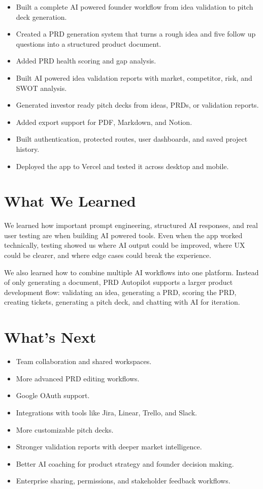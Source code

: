 \documentclass[11pt]{article}
\begin{document}
\begin{itemize}
    \item Built a complete AI powered founder workflow from idea validation to pitch deck generation.
    \item Created a PRD generation system that turns a rough idea and five follow up questions into a structured product document.
    \item Added PRD health scoring and gap analysis.
    \item Built AI powered idea validation reports with market, competitor, risk, and SWOT analysis.
    \item Generated investor ready pitch decks from ideas, PRDs, or validation reports.
    \item Added export support for PDF, Markdown, and Notion.
    \item Built authentication, protected routes, user dashboards, and saved project history.
    \item Deployed the app to Vercel and tested it across desktop and mobile.
\end{itemize}

\section{What We Learned}

We learned how important prompt engineering, structured AI responses, and real user testing are when building AI powered tools. Even when the app worked technically, testing showed us where AI output could be improved, where UX could be clearer, and where edge cases could break the experience.

We also learned how to combine multiple AI workflows into one platform. Instead of only generating a document, PRD Autopilot supports a larger product development flow: validating an idea, generating a PRD, scoring the PRD, creating tickets, generating a pitch deck, and chatting with AI for iteration.

\section{What's Next}

\begin{itemize}
    \item Team collaboration and shared workspaces.
    \item More advanced PRD editing workflows.
    \item Google OAuth support.
    \item Integrations with tools like Jira, Linear, Trello, and Slack.
    \item More customizable pitch decks.
    \item Stronger validation reports with deeper market intelligence.
    \item Better AI coaching for product strategy and founder decision making.
    \item Enterprise sharing, permissions, and stakeholder feedback workflows.
\end{itemize}
\end{document}
